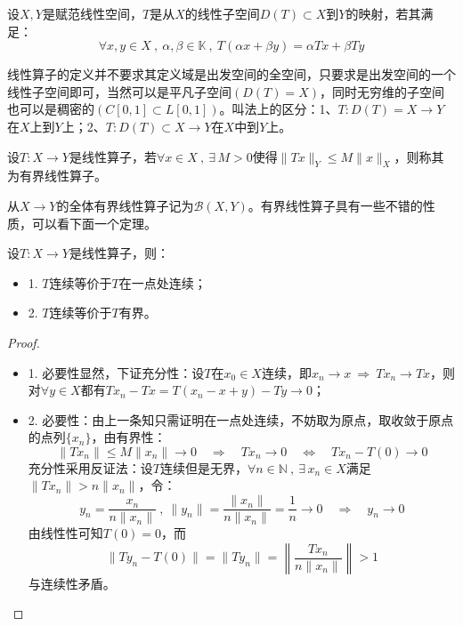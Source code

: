 \begin{definition}[线性算子]
设$X,Y$是赋范线性空间，$T$是从$X$的线性子空间$D(T) \subset X$到$Y$的映射，若其满足：
\[\forall x,y \in X \ , \ \alpha,\beta \in \mathbb{K} \ , \ T(\alpha x+\beta y)=\alpha Tx+\beta Ty\]
\end{definition}
\begin{remark}
线性算子的定义并不要求其定义域是出发空间的全空间，只要求是出发空间的一个线性子空间即可，当然可以是平凡子空间$(D(T)=X)$，同时无穷维的子空间也可以是稠密的$(C[0,1] \subset L[0,1])$。叫法上的区分：1、$T:D(T)=X \to Y$在$X$上到$Y$上；2、$T:D(T) \subset X \to Y$在$X$中到$Y$上。
\end{remark}
\begin{definition}[有界线性算子]
设$T:X \to Y$是线性算子，若$\forall x \in X \ , \ \exists \, M>0$使得$\|Tx\|_Y \leq M\|x\|_X$，则称其为有界线性算子。
\end{definition}
从$X \to Y$的全体有界线性算子记为$\mathscr{B}(X,Y)$。有界线性算子具有一些不错的性质，可以看下面一个定理。
\begin{theorem}\label{theorem:yjlx}
设$T:X \to Y$是线性算子，则：
\begin{itemize}
\item 1. $T$连续等价于$T$在一点处连续；
\item 2. $T$连续等价于$T$有界。
\end{itemize}
\end{theorem}
\begin{proof}
\begin{itemize}
\item 1. 必要性显然，下证充分性：设$T$在$x_0 \in X$连续，即$x_n \to x \ \Rightarrow \ Tx_n \to Tx$，则对$\forall y \in X$都有$Tx_n-Tx=T(x_n-x+y)-Ty \to 0$；
\item 2. 必要性：由上一条知只需证明在一点处连续，不妨取为原点，取收敛于原点的点列$\{x_n\}$，由有界性：
\[\|Tx_n\| \leq M\|x_n\| \to 0 \quad \Rightarrow \quad Tx_n \to 0 \quad \Leftrightarrow \quad Tx_n-T(0) \to 0\]
充分性采用反证法：设$T$连续但是无界，$\forall n \in \mathbb{N} \ , \ \exists \, x_n \in X$满足$\|Tx_n\|>n\|x_n\|$，令：
\[y_n=\frac{x_n}{n\|x_n\|} \ , \ \|y_n\|=\frac{\|x_n\|}{n\|x_n\|}=\frac{1}{n} \to 0 \quad \Rightarrow \quad y_n \to 0\]
由线性性可知$T(0)=0$，而
\[\|Ty_n-T(0)\|=\|Ty_n\|=\left\|\frac{Tx_n}{n\|x_n\|}\right\|>1\]
与连续性矛盾。
\end{itemize}
\end{proof}

